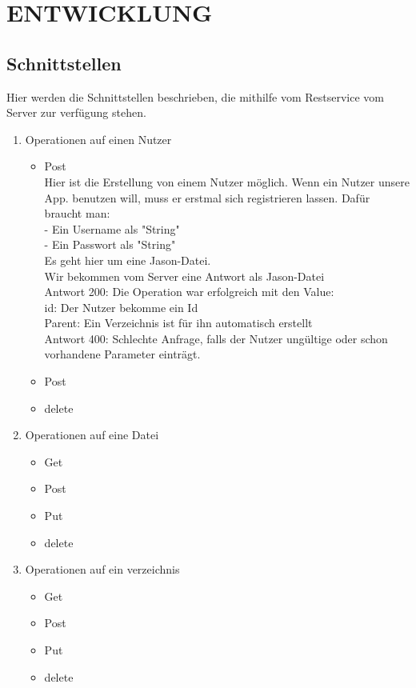 \section{\uppercase{Entwicklung}}
\subsection{Schnittstellen}
Hier werden die Schnittstellen beschrieben, die mithilfe vom Restservice vom Server zur verf\"ugung stehen.
\begin{enumerate}
\item Operationen auf einen Nutzer
	\begin{itemize}
	\item Post \\
Hier ist die Erstellung von einem Nutzer m\"oglich. Wenn ein Nutzer unsere App. benutzen will, muss er erstmal sich registrieren lassen. Daf\"ur braucht man: \\
	- Ein Username als "String" \\
	- Ein Passwort als "String" \\
Es geht hier um eine Jason-Datei. \\
Wir bekommen vom Server eine Antwort als Jason-Datei \\
Antwort 200: Die Operation war erfolgreich mit den Value: \\ 
	id: Der Nutzer bekomme ein Id \\ 
	Parent: Ein Verzeichnis ist f\"ur ihn automatisch erstellt \\ 
Antwort 400: Schlechte Anfrage, falls der Nutzer ung\"ultige oder schon vorhandene Parameter eintr\"agt.  

	\item Post
	\item delete
	\end{itemize}

\item Operationen auf eine Datei
	\begin{itemize}
	\item Get
	\item Post
	\item Put
	\item delete
	\end{itemize}

\item Operationen auf ein verzeichnis
	\begin{itemize}
	\item Get
	\item Post
	\item Put
	\item delete
	\end{itemize}
\end{enumerate}